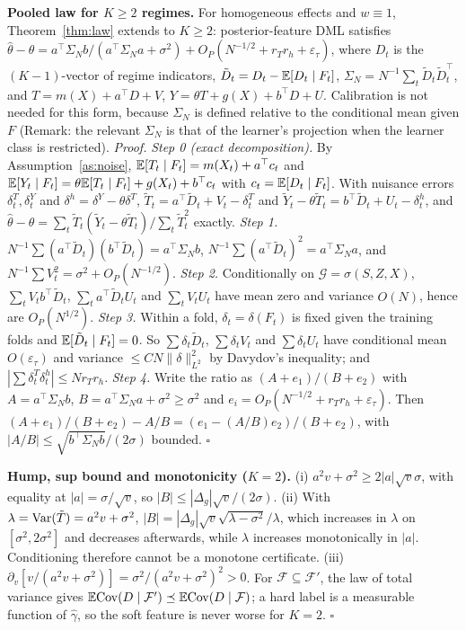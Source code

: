 \textbf{Pooled law for $K\ge2$ regimes.} For homogeneous effects and $w\equiv1$, Theorem~\ref{thm:law} extends to $K\ge2$: posterior-feature DML satisfies $\hat\theta-\theta=a^\top\Sigma_Nb/(a^\top\Sigma_Na+\sigma^2)+O_P(N^{-1/2}+r_Tr_h+\varepsilon_\tau)$, where $D_t$ is the $(K{-}1)$-vector of regime indicators, $\tilde D_t=D_t-\mathbb{E}[D_t\mid F_t]$, $\Sigma_N=N^{-1}\sum_t\tilde D_t\tilde D_t^\top$, and $T=m(X)+a^\top D+V$, $Y=\theta T+g(X)+b^\top D+U$. Calibration is not needed for this form, because $\Sigma_N$ is defined relative to the conditional mean given $F$ (Remark: the relevant $\Sigma_N$ is that of the learner's projection when the learner class is restricted).
\emph{Proof.} \emph{Step 0 (exact decomposition).} By Assumption~\ref{as:noise}, $\mathbb{E}[T_t\mid F_t]=m(X_t)+a^\top c_t$ and $\mathbb{E}[Y_t\mid F_t]=\theta\mathbb{E}[T_t\mid F_t]+g(X_t)+b^\top c_t$ with $c_t=\mathbb{E}[D_t\mid F_t]$. With nuisance errors $\delta^T_t,\delta^Y_t$ and $\delta^h=\delta^Y-\theta\delta^T$, $\tilde T_t=a^\top\tilde D_t+V_t-\delta^T_t$ and $\tilde Y_t-\theta\tilde T_t=b^\top\tilde D_t+U_t-\delta^h_t$, and $\hat\theta-\theta=\sum_t\tilde T_t(\tilde Y_t-\theta\tilde T_t)/\sum_t\tilde T_t^2$ exactly.
\emph{Step 1.} $N^{-1}\sum(a^\top\tilde D_t)(b^\top\tilde D_t)=a^\top\Sigma_Nb$, $N^{-1}\sum(a^\top\tilde D_t)^2=a^\top\Sigma_Na$, and $N^{-1}\sum V_t^2=\sigma^2+O_P(N^{-1/2})$.
\emph{Step 2.} Conditionally on $\mathcal G=\sigma(S,Z,X)$, $\sum_tV_tb^\top\tilde D_t$, $\sum_ta^\top\tilde D_tU_t$ and $\sum_tV_tU_t$ have mean zero and variance $O(N)$, hence are $O_P(N^{1/2})$.
\emph{Step 3.} Within a fold, $\delta_t=\delta(F_t)$ is fixed given the training folds and $\mathbb{E}[\tilde D_t\mid F_t]=0$. So $\sum\delta_t\tilde D_t$, $\sum\delta_tV_t$ and $\sum\delta_tU_t$ have conditional mean $O(\varepsilon_\tau)$ and variance $\le CN\|\delta\|^2_{L^2}$ by Davydov's inequality; and $|\sum\delta^T_t\delta^h_t|\le Nr_Tr_h$.
\emph{Step 4.} Write the ratio as $(A+e_1)/(B+e_2)$ with $A=a^\top\Sigma_Nb$, $B=a^\top\Sigma_Na+\sigma^2\ge\sigma^2$ and $e_i=O_P(N^{-1/2}+r_Tr_h+\varepsilon_\tau)$. Then $(A+e_1)/(B+e_2)-A/B=(e_1-(A/B)e_2)/(B+e_2)$, with $|A/B|\le\sqrt{b^\top\Sigma_Nb}/(2\sigma)$ bounded. $\square$

\textbf{Hump, sup bound and monotonicity ($K=2$).} (i) $a^2v+\sigma^2\ge2|a|\sqrt v\sigma$, with equality at $|a|=\sigma/\sqrt v$, so $|B|\le|\Delta_g|\sqrt v/(2\sigma)$. (ii) With $\lambda=\mathrm{Var}(\tilde T)=a^2v+\sigma^2$, $|B|=|\Delta_g|\sqrt v\sqrt{\lambda-\sigma^2}/\lambda$, which increases in $\lambda$ on $[\sigma^2,2\sigma^2]$ and decreases afterwards, while $\lambda$ increases monotonically in $|a|$. Conditioning therefore cannot be a monotone certificate. (iii) $\partial_v[v/(a^2v+\sigma^2)]=\sigma^2/(a^2v+\sigma^2)^2>0$. For $\mathcal F\subseteq\mathcal F'$, the law of total variance gives $\mathbb{E}\mathrm{Cov}(D\mid\mathcal F')\preceq\mathbb{E}\mathrm{Cov}(D\mid\mathcal F)$; a hard label is a measurable function of $\hat\gamma$, so the soft feature is never worse for $K=2$. $\square$

